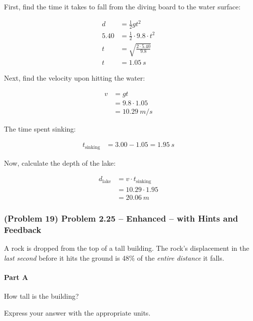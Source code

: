 \begin{solution}
	First, find the time it takes to fall from the diving board to the water surface:

	\begin{align*}
		d &= \frac{1}{2} g t^2 \\
		5.40 &= \frac{1}{2} \cdot 9.8 \cdot t^2 \\
		t &= \sqrt{\frac{2 \cdot 5.40}{9.8}} \\
		t &= \SI{1.05}{s}
	\end{align*}

	Next, find the velocity upon hitting the water:

	\begin{align*}
		v &= g t \\
		&= 9.8 \cdot 1.05 \\
		&= \SI{10.29}{m/s}
	\end{align*}

	The time spent sinking:

	\begin{align*}
		t_{\mathrm{sinking}} &= 3.00 - 1.05 = \SI{1.95}{s}
	\end{align*}

	Now, calculate the depth of the lake:

	\begin{align*}
		d_{\mathrm{lake}} &= v \cdot t_{\mathrm{sinking}} \\
		&= 10.29 \cdot 1.95 \\
		&= \boxed{\SI{20.06}{m}}
	\end{align*}
\end{solution}

\newpage

\subsubsection{(Problem 19) Problem 2.25 -- Enhanced -- with Hints and Feedback}

A rock is dropped from the top of a tall building. The rock's displacement in the \emph{last second} before it hits the ground is 48\% of the \emph{entire distance} it falls.

\paragraph{Part A}
How tall is the building?

Express your answer with the appropriate units.

